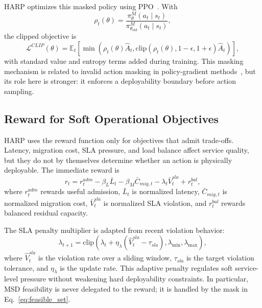 \documentclass[final,5p]{elsarticle}
\begin{document}
HARP optimizes this masked policy using PPO~\cite{schulman2017proximal}. With
\begin{equation}
    \rho_t(\theta)=
    \frac{\pi_\theta^{M}(a_t\mid s_t)}
    {\pi_{\theta_{old}}^{M}(a_t\mid s_t)},
\end{equation}
the clipped objective is
\begin{equation}
    \mathcal{L}^{CLIP}(\theta)
    =
    \mathbb{E}_t
    \left[
    \min
    \left(
    \rho_t(\theta)\hat{A}_t,
    \mathrm{clip}(\rho_t(\theta),1-\epsilon,1+\epsilon)\hat{A}_t
    \right)
    \right],
\end{equation}
with standard value and entropy terms added during training. This masking mechanism is related to invalid action masking in policy-gradient methods~\cite{huang2022closer}, but its role here is stronger: it enforces a deployability boundary before action sampling.

\subsection{Reward for Soft Operational Objectives}
\label{subsec:harp_penalty}

HARP uses the reward function only for objectives that admit trade-offs. Latency, migration cost, SLA pressure, and load balance affect service quality, but they do not by themselves determine whether an action is physically deployable. The immediate reward is
\begin{equation}
    r_t
    =
    r_t^{adm}
    -\beta_L \bar{L}_t
    -\beta_M \bar{C}_{mig,t}
    -\lambda_t \bar{V}^{sla}_t
    +r_t^{bal},
    \label{eq:harp_reward}
\end{equation}
where \(r_t^{adm}\) rewards useful admission, \(\bar{L}_t\) is normalized latency, \(\bar{C}_{mig,t}\) is normalized migration cost, \(\bar{V}^{sla}_t\) is normalized SLA violation, and \(r_t^{bal}\) rewards balanced residual capacity.

The SLA penalty multiplier is adapted from recent violation behavior:
\begin{equation}
    \lambda_{t+1}
    =
    \mathrm{clip}
    \left(
    \lambda_t+\eta_\lambda(\hat{V}^{sla}_t-\tau_{sla}),
    \lambda_{\min},
    \lambda_{\max}
    \right),
    \label{eq:lambda_update}
\end{equation}
where \(\hat{V}^{sla}_t\) is the violation rate over a sliding window, \(\tau_{sla}\) is the target violation tolerance, and \(\eta_\lambda\) is the update rate. This adaptive penalty regulates soft service-level pressure without weakening hard deployability constraints. In particular, MSD feasibility is never delegated to the reward; it is handled by the mask in Eq.~\eqref{eq:feasible_set}.
\end{document}
